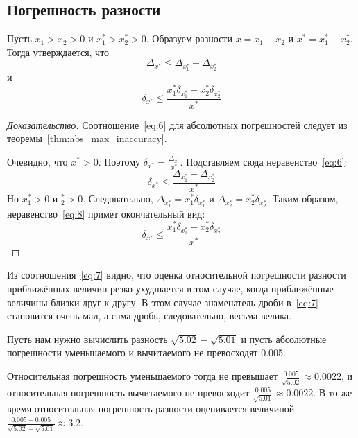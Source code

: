 \subsection{Погрешность разности}
\begin{theorem}
	Пусть $x_1 > x_2 > 0$ и $x^*_1 > x^*_2 > 0$. Образуем разности $x = x_1
	- x_2$ и $x^* = x^*_1 - x^*_2$. Тогда утверждается, что
	\begin{equation}
		\Delta_{x^*} \leq \Delta_{x^*_1} + \Delta_{x^*_2}
		\label{eq:6}
	\end{equation}
	и
	\begin{equation}
		\delta_{x^*} \leq \frac{x^*_1 \delta_{x^*_1} + x^*_2
		\delta_{x^*_2}}{x^*}
		\label{eq:7}
	\end{equation}
\end{theorem}
\begin{proof}[Доказательство]
	Соотношение~\ref{eq:6} для абсолютных погрешностей следует из
	теоремы~\ref{thm:abs_max_inaccuracy}.

	Очевидно, что $x^* > 0$. Поэтому $\delta_{x^*} =
	\frac{\Delta_{x^*}}{x^*}$. Подставляем сюда неравенство~\ref{eq:6}:
	\begin{equation}
		\delta_{x^*} \leq \frac{\Delta_{x^*_1} + \Delta_{x^*_2}}{x^*}
		\label{eq:8}
	\end{equation}
	Но $x^*_1 > 0$ и $^*_2 > 0$. Следовательно, $\Delta_{x^*_1} = x^*_1
	\delta_{x^*_1}$ и $\Delta_{x^*_2} = x^*_2 \delta_{x^*_2}$.
	Таким образом, неравенство~\ref{eq:8} примет окончательный вид:
	\begin{equation}
		\delta_{x^*} \leq \frac{x^*_1 \delta_{x^*_1} + x^*_2
		\delta_{x^*_2}}{x^*}
		\label{7}
	\end{equation}
\end{proof}
\begin{remark}
	Из соотношения~\ref{eq:7} видно, что оценка относительной погрешности
	разности приближённых величин резко ухудшается в том случае, когда
	приближённые величины близки друг к другу. В этом случае знаменатель
	дроби в~\ref{eq:7} становится очень мал, а сама дробь, следовательно,
	весьма велика.
\end{remark}
\begin{example}
	Пусть нам нужно вычислить разность $\sqrt{5.02} - \sqrt{5.01}$ и пусть
	абсолютные погрешности уменьшаемого и вычитаемого не превосходят 0.005.

	Относительная погрешность уменьшаемого тогда не превышает
	$\frac{0.005}{\sqrt{5.02}} \approx 0.0022$,
	и относительная погрешность вычитаемого не превосходит
	$\frac{0.005}{\sqrt{5.01}} \approx 0.0022$.
	В то же время относительная погрешность разности оценивается величиной
	$\frac{0.005 + 0.005}{\sqrt{5.02} - \sqrt{5.01}} \approx 3.2$.
\end{example}


